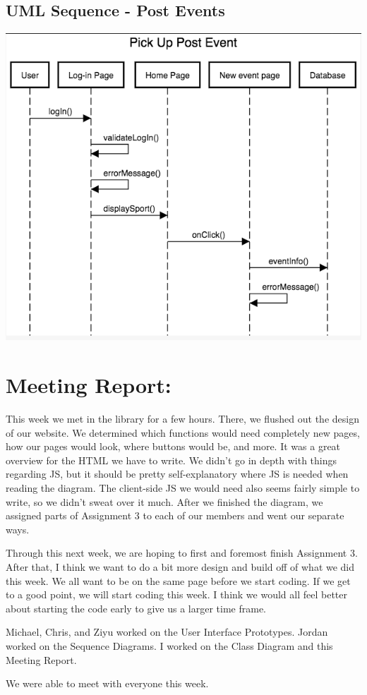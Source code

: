 \documentclass[a4paper]{article}
\begin{document}
\subsection{UML Sequence - Post Events}
\includegraphics[width=\textwidth]{images/uml3.png}

\section{Meeting Report:}
This week we met in the library for a few hours. There, we flushed out the design of our website. We determined which functions would need completely new pages, how our pages would look, where buttons would be, and more. It was a great overview for the HTML we have to write. We didn’t go in depth with things regarding JS, but it should be pretty self-explanatory where JS is needed when reading the diagram. The client-side JS we would need also seems fairly simple to write, so we didn’t sweat over it much. After we finished the diagram, we assigned parts of Assignment 3 to each of our members and went our separate ways.

Through this next week, we are hoping to first and foremost finish Assignment 3. After that, I think we want to do a bit more design and build off of what we did this week. We all want to be on the same page before we start coding. If we get to a good point, we will start coding this week. I think we would all feel better about starting the code early to give us a larger time frame.

Michael, Chris, and Ziyu worked on the User Interface Prototypes. Jordan worked on the Sequence Diagrams. I worked on the Class Diagram and this Meeting Report.

We were able to meet with everyone this week.
\end{document}
